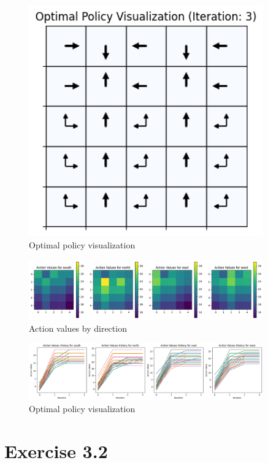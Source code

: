 \documentclass{article} %
\begin{document}
	\begin{figure}[h!]
		\centering
		\includegraphics[width=0.9\textwidth]{images/3.1c.1.png}
		\caption{Optimal policy visualization}
		\label{fig:6}
	\end{figure}
	
	\begin{figure}[h!]
		\centering
		\includegraphics[width=0.9\textwidth]{images/3.1c.2.png}
		\caption{Action values by direction}
		\label{fig:7}
	\end{figure}
	\begin{figure}[h!]
		\centering
		\includegraphics[width=0.9\textwidth]{images/3.1c.3.png}
		\caption{Optimal policy visualization}
		\label{fig:8}
	\end{figure}
	\clearpage
	\section{Exercise 3.2}
\end{document}
